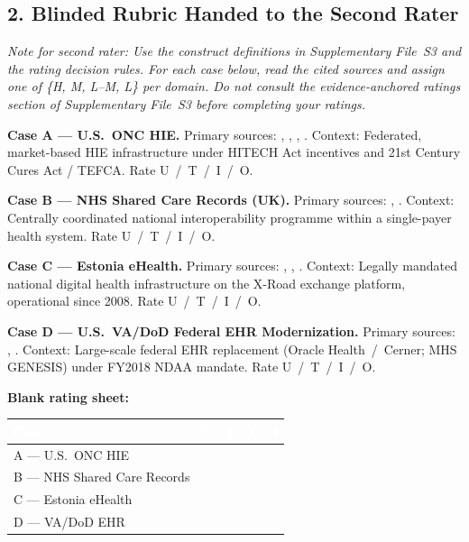 \bigskip


\subsection*{2. Blinded Rubric Handed to the Second Rater}

\noindent\textit{Note for second rater: Use the construct definitions in Supplementary
File~S3 and the rating decision rules. For each case below, read the cited sources and
assign one of \{H, M, L--M, L\} per domain. Do not consult the evidence-anchored ratings
section of Supplementary File~S3 before completing your ratings.}

\medskip
\noindent\textbf{Case A --- U.S.\ ONC HIE.}
Primary sources: \cite{onc2025reports}, \cite{holmgren2023policyhie},
\cite{eden2016barriers}, \cite{kruse2016adoption}.
Context: Federated, market-based HIE infrastructure under HITECH Act incentives
and 21st Century Cures Act / TEFCA. Rate U~/~T~/~I~/~O.

\medskip
\noindent\textbf{Case B --- NHS Shared Care Records (UK).}
Primary sources: \cite{nhs2025sharedcare}, \cite{fennelly2020national}.
Context: Centrally coordinated national interoperability programme within a single-payer
health system. Rate U~/~T~/~I~/~O.

\medskip
\noindent\textbf{Case C --- Estonia eHealth.}
Primary sources: \cite{estonia2026ehealth}, \cite{europeancommission2016estoniaehr},
\cite{holmgren2023policyhie}.
Context: Legally mandated national digital health infrastructure on the X-Road exchange
platform, operational since 2008. Rate U~/~T~/~I~/~O.

\medskip
\noindent\textbf{Case D --- U.S.\ VA/DoD Federal EHR Modernization.}
Primary sources: \cite{gao2025vaehr}, \cite{gao2024dodehr}.
Context: Large-scale federal EHR replacement (Oracle Health~/~Cerner; MHS GENESIS)
under FY2018 NDAA mandate. Rate U~/~T~/~I~/~O.

\medskip

\noindent\textbf{Blank rating sheet:}

\renewcommand{\arraystretch}{1.25}
\begin{table}[H]
\footnotesize
\centering
\begin{tabular}{lcccc}
\toprule
\rowcolor{headerblue}
\textcolor{white}{\textbf{Case}} &
\textcolor{white}{\textbf{U}} &
\textcolor{white}{\textbf{T}} &
\textcolor{white}{\textbf{I}} &
\textcolor{white}{\textbf{O}} \\
\midrule
\rowcolor{rowgray}
A --- U.S.\ ONC HIE &  &  &  &  \\
B --- NHS Shared Care Records &  &  &  &  \\
\rowcolor{rowgray}
C --- Estonia eHealth &  &  &  &  \\
D --- VA/DoD EHR &  &  &  &  \\
\bottomrule
\end{tabular}
\end{table}

